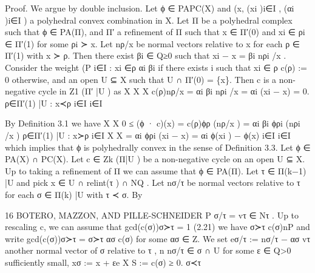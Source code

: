 \documentclass[
  11pt,
]{article}
\newenvironment{Shaded}{}{}
\newcommand{\NormalTok}[1]{#1}
\begin{document}
\begin{Shaded}
\begin{Highlighting}[]
\NormalTok{Proof. We argue by double inclusion. Let ϕ ∈ PAPC(X) and (x, (xi )i∈I , (αi )i∈I ) a polyhedral}
\NormalTok{convex combination in X. Let Π be a polyhedral complex such that ϕ ∈ PA(Π), and Π′ a refinement}
\NormalTok{of Π such that x ∈ Π′(0) and xi ∈ ρi ∈ Π′(1) for some ρi ≻ x. Let nρ/x be normal vectors relative to}
\NormalTok{x for each ρ ∈ Π′(1) with x ≻ ρ. Then there exist βi ∈ Q≥0 such that xi − x = βi nρi /x . Consider}
\NormalTok{the weight                  (P}
\NormalTok{                                i∈I : xi ∈ρ αi βi if there exists i such that xi ∈ ρ}
\NormalTok{                    c(ρ) :=}
\NormalTok{                             0                    otherwise,}
\NormalTok{and an open U ⊆ X such that U ∩ Π′(0) = \{x\}. Then c is a non{-}negative cycle in Z1 (Π′ |U ) as}
\NormalTok{                     X                   X                 X}
\NormalTok{                             c(ρ)nρ/x =     αi βi nρi /x =   αi (xi − x) = 0.}
\NormalTok{                     ρ∈Π′(1) |U : x≺ρ               i∈I                    i∈I}

\NormalTok{By Definition 3.1 we have}
\NormalTok{                                              X                               X}
\NormalTok{                   0 ≤ (ϕ · c)(x) =                        c(ρ)ϕρ (nρ/x ) =            αi βi ϕρi (nρi /x )}
\NormalTok{                                        ρ∈Π′(1) |U : x≻ρ                         i∈I}
\NormalTok{                                        X                         X}
\NormalTok{                                    =         αi ϕρi (xi − x) =          αi ϕ(xi ) − ϕ(x)}
\NormalTok{                                        i∈I                        i∈I}
\NormalTok{which implies that ϕ is polyhedrally convex in the sense of Definition 3.3.}
\NormalTok{   Let ϕ ∈ PA(X) ∩ PC(X). Let c ∈ Zk (Π|U ) be a non{-}negative cycle on an open U ⊆ X.}
\NormalTok{Up to taking a refinement of Π we can assume that ϕ ∈ PA(Π). Let τ ∈ Π(k−1) |U and pick}
\NormalTok{x ∈ U ∩ relint(τ ) ∩ NQ . Let nσ/τ be normal vectors relative to τ for each σ ∈ Π(k) |U with τ ≺ σ. By}

\NormalTok{16                                   BOTERO, MAZZON, AND PILLE{-}SCHNEIDER}
\NormalTok{              P}
\NormalTok{                        σ/τ = vτ ∈ Nτ . Up to rescaling c, we can assume that gcd(c(σ))σ≻τ = 1}
\NormalTok{(2.21) we have σ≻τ c(σ)nP}
\NormalTok{and write gcd(c(σ))σ≻τ = σ≻τ ασ c(σ) for some ασ ∈ Z. We set}
\NormalTok{                    eσ/τ := nσ/τ − ασ vτ another normal vector of σ relative to τ ,}
\NormalTok{                    n}
\NormalTok{                                 nσ/τ ∈ σ ∩ U for some ε ∈ Q\textgreater{}0 sufficiently small,}
\NormalTok{                      xσ := x + εe}
\NormalTok{                            X}
\NormalTok{                       S :=     c(σ) ≥ 0.}
\NormalTok{                              σ≺τ}


\end{Highlighting}
\end{Shaded}
\end{document}
